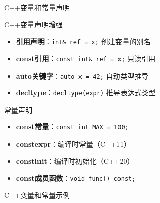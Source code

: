 \documentclass[UTF8,aspectratio=169]{beamer}
\begin{document}
\begin{frame}{C++变量和常量声明}
    \begin{ytublock}{C++变量声明增强}
        \begin{itemize}
            \item \textbf{引用声明}：\texttt{int\& ref = x;} 创建变量的别名
            \item \textbf{const引用}：\texttt{const int\& ref = x;} 只读引用
            \item \textbf{auto关键字}：\texttt{auto x = 42;} 自动类型推导
            \item \textbf{decltype}：\texttt{decltype(expr)} 推导表达式类型
        \end{itemize}
    \end{ytublock}

    \begin{ytublock}{常量声明}
        \begin{itemize}
            \item \textbf{const常量}：\texttt{const int MAX = 100;}
            \item \textbf{constexpr}：编译时常量（C++11）
            \item \textbf{constinit}：编译时初始化（C++20）
            \item \textbf{const成员函数}：\texttt{void func() const;}
        \end{itemize}
    \end{ytublock}
\end{frame}

\begin{frame}[fragile]{C++变量和常量示例}
    \inputminted[firstline=1,lastline=15]{cpp}{code/cpp_variables_constants.cpp}
\end{frame}
\end{document}
